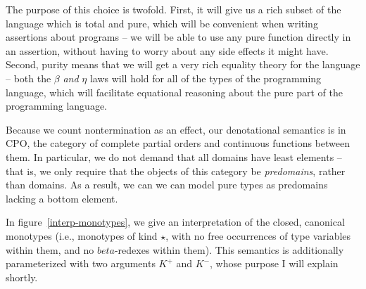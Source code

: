 The purpose of this choice is twofold. First, it will give us a rich
subset of the language which is total and pure, which will be convenient
when writing assertions about programs -- we will be able to use any pure 
function directly in an assertion, without having to worry about any 
side effects it might have. Second, purity means that we will get a 
very rich equality theory for the language -- both the $\beta$ \emph{and}
$\eta$ laws will hold for all of the types of the programming language,
which will facilitate equational reasoning about the pure part of the 
programming language. 

Because we count nontermination as an effect, our denotational
semantics is in CPO, the category of complete partial orders and
continuous functions between them. In particular, we do not demand
that all domains have least elements -- that is, we only require that
the objects of this category be \emph{predomains}, rather than
domains. As a result, we can we can model pure types as predomains
lacking a bottom element.

In figure~\ref{interp-monotypes}, we give an interpretation of the
closed, canonical monotypes (i.e., monotypes of kind $\star$, with no
free occurrences of type variables within them, and no $beta$-redexes
within them).  This semantics is additionally parameterized with two
arguments $K^+$ and $K^-$, whose purpose I will explain shortly.

